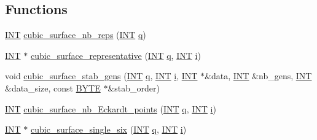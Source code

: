 \subsection*{Functions}
\begin{DoxyCompactItemize}
\item 
\mbox{\hyperlink{galois_8h_a09fddde158a3a20bd2dcadb609de11dc}{I\+NT}} \mbox{\hyperlink{data_8_c_a9c43cb83fa614318846e4956ddbbf507}{cubic\+\_\+surface\+\_\+nb\+\_\+reps}} (\mbox{\hyperlink{galois_8h_a09fddde158a3a20bd2dcadb609de11dc}{I\+NT}} \mbox{\hyperlink{simeon_8_c_a92cbb483a3b27ae1a0dbfcb125ce216f}{q}})
\item 
\mbox{\hyperlink{galois_8h_a09fddde158a3a20bd2dcadb609de11dc}{I\+NT}} $\ast$ \mbox{\hyperlink{data_8_c_a52b6ab9311ec4853f3beaec496650ac6}{cubic\+\_\+surface\+\_\+representative}} (\mbox{\hyperlink{galois_8h_a09fddde158a3a20bd2dcadb609de11dc}{I\+NT}} \mbox{\hyperlink{simeon_8_c_a92cbb483a3b27ae1a0dbfcb125ce216f}{q}}, \mbox{\hyperlink{galois_8h_a09fddde158a3a20bd2dcadb609de11dc}{I\+NT}} \mbox{\hyperlink{alphabet2_8_c_acb559820d9ca11295b4500f179ef6392}{i}})
\item 
void \mbox{\hyperlink{data_8_c_a106411b4e1f342f5985c419fd3583d77}{cubic\+\_\+surface\+\_\+stab\+\_\+gens}} (\mbox{\hyperlink{galois_8h_a09fddde158a3a20bd2dcadb609de11dc}{I\+NT}} \mbox{\hyperlink{simeon_8_c_a92cbb483a3b27ae1a0dbfcb125ce216f}{q}}, \mbox{\hyperlink{galois_8h_a09fddde158a3a20bd2dcadb609de11dc}{I\+NT}} \mbox{\hyperlink{alphabet2_8_c_acb559820d9ca11295b4500f179ef6392}{i}}, \mbox{\hyperlink{galois_8h_a09fddde158a3a20bd2dcadb609de11dc}{I\+NT}} $\ast$\&data, \mbox{\hyperlink{galois_8h_a09fddde158a3a20bd2dcadb609de11dc}{I\+NT}} \&nb\+\_\+gens, \mbox{\hyperlink{galois_8h_a09fddde158a3a20bd2dcadb609de11dc}{I\+NT}} \&data\+\_\+size, const \mbox{\hyperlink{galois_8h_ab6cc7b4aeb6ea31aba2b3fbfc83ff5e6}{B\+Y\+TE}} $\ast$\&stab\+\_\+order)
\item 
\mbox{\hyperlink{galois_8h_a09fddde158a3a20bd2dcadb609de11dc}{I\+NT}} \mbox{\hyperlink{data_8_c_a01c894aab7a696c8b2853063677c775a}{cubic\+\_\+surface\+\_\+nb\+\_\+\+Eckardt\+\_\+points}} (\mbox{\hyperlink{galois_8h_a09fddde158a3a20bd2dcadb609de11dc}{I\+NT}} \mbox{\hyperlink{simeon_8_c_a92cbb483a3b27ae1a0dbfcb125ce216f}{q}}, \mbox{\hyperlink{galois_8h_a09fddde158a3a20bd2dcadb609de11dc}{I\+NT}} \mbox{\hyperlink{alphabet2_8_c_acb559820d9ca11295b4500f179ef6392}{i}})
\item 
\mbox{\hyperlink{galois_8h_a09fddde158a3a20bd2dcadb609de11dc}{I\+NT}} $\ast$ \mbox{\hyperlink{data_8_c_a526ae8988443f7373c98d46d1eaa9d12}{cubic\+\_\+surface\+\_\+single\+\_\+six}} (\mbox{\hyperlink{galois_8h_a09fddde158a3a20bd2dcadb609de11dc}{I\+NT}} \mbox{\hyperlink{simeon_8_c_a92cbb483a3b27ae1a0dbfcb125ce216f}{q}}, \mbox{\hyperlink{galois_8h_a09fddde158a3a20bd2dcadb609de11dc}{I\+NT}} \mbox{\hyperlink{alphabet2_8_c_acb559820d9ca11295b4500f179ef6392}{i}})

\end{DoxyCompactItemize}
